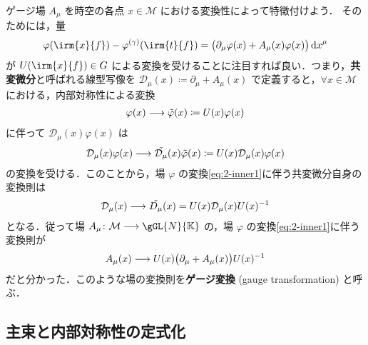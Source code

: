 \documentclass[TQFT_main]{subfiles}
\begin{document}
ゲージ場 $A_\mu$ を時空の各点 $x \in \mathcal{M}$ における変換性によって特徴付けよう．
そのためには，量
\begin{align}
    \varphi (\irm{x}{f}) - \varphi^{(\gamma)}(\irm{t}{f}) = \bigl( \partial_\mu \varphi (x) + A_\mu(x) \varphi (x) \bigr) \dd{x}^\mu
\end{align}
が $U(\irm{x}{f}) \in G$ による変換を受けることに注目すれば良い．つまり，\textbf{共変微分}と呼ばれる線型写像を $\mathcal{D}_\mu (x) \coloneqq \partial_\mu + A_\mu (x)$ で定義すると，$\forall x \in \mathcal{M}$ における，内部対称性による変換
\begin{align}
    \label{eq:2-inner1}
    \varphi(x) \longrightarrow \tilde{\varphi}(x) \coloneqq U(x) \varphi (x)
\end{align}
に伴って $\mathcal{D}_\mu (x) \varphi (x)$ は
\begin{align}
    \mathcal{D}_\mu(x) \varphi(x) \longrightarrow \tilde{\mathcal{D}_\mu} (x) \tilde{\varphi}(x) \coloneqq U(x) \mathcal{D}_\mu (x) \varphi(x)
\end{align}
の変換を受ける．このことから，場 $\varphi$ の変換\eqref{eq:2-inner1}に伴う共変微分自身の変換則は
\begin{align}
    \mathcal{D}_\mu (x) \longrightarrow \tilde{D_\mu} (x) = U(x) \mathcal{D}_\mu (x) U(x)^{-1}
\end{align}
となる．従って場 $A_\mu \colon \mathcal{M} \lto \gGL{N}{\mathbb{K}}$ の，場 $\varphi$ の変換\eqref{eq:2-inner1}に伴う変換則が
\begin{align}
    \label{eq:def-gauge-transform}
    A_\mu (x) \longrightarrow U(x)\bigl(\partial_\mu + A_\mu(x) \bigr) U(x)^{-1}
\end{align}
だと分かった．このような場の変換則を\textbf{ゲージ変換} (gauge transformation) と呼ぶ．
    

\subsection{主束と内部対称性の定式化}
\end{document}
